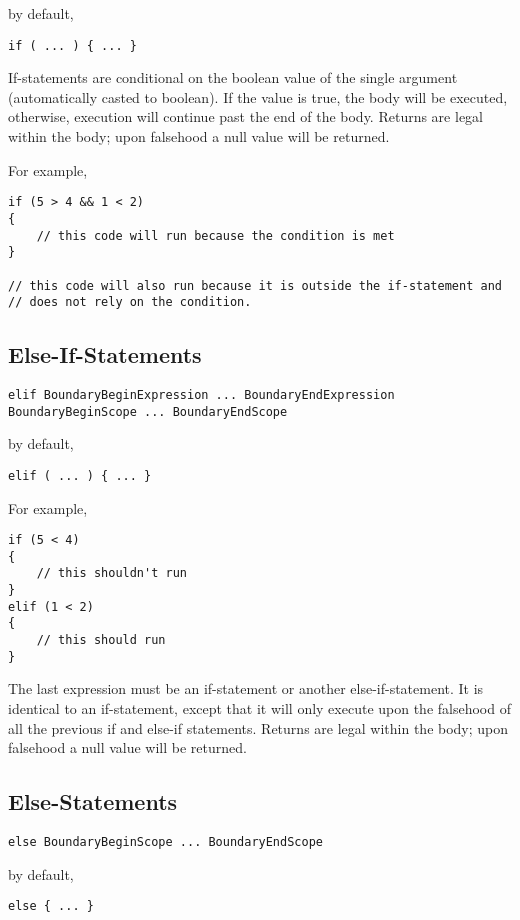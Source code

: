 \documentclass[10pt,a4paper]{article}
\begin{document}
by default,
\begin{verbatim}
if ( ... ) { ... }
\end{verbatim}

If-statements are conditional on the boolean value of the single argument (automatically casted to boolean). If the value is true, the body will be executed, otherwise, execution will continue past the end of the body. Returns are legal within the body; upon falsehood a null value will be returned.

For example,
\begin{verbatim}
if (5 > 4 && 1 < 2)
{
    // this code will run because the condition is met
}

// this code will also run because it is outside the if-statement and
// does not rely on the condition. 
\end{verbatim}

\subsection{Else-If-Statements}
\begin{verbatim}
elif BoundaryBeginExpression ... BoundaryEndExpression BoundaryBeginScope ... BoundaryEndScope
\end{verbatim}

by default,
\begin{verbatim}
elif ( ... ) { ... }
\end{verbatim}

For example,
\begin{verbatim}
if (5 < 4)
{
    // this shouldn't run
}
elif (1 < 2)
{
    // this should run
}
\end{verbatim}

The last expression must be an if-statement or another else-if-statement. It is identical to an if-statement, except that it will only execute upon the falsehood of all the previous if and else-if statements. Returns are legal within the body; upon falsehood a null value will be returned.

\subsection{Else-Statements}
\begin{verbatim}
else BoundaryBeginScope ... BoundaryEndScope
\end{verbatim}

by default,
\begin{verbatim}
else { ... }
\end{verbatim}
\end{document}
